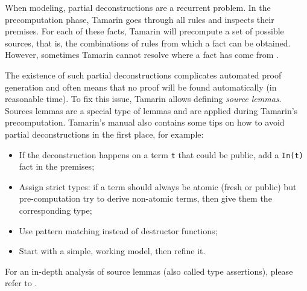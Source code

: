 When modeling, partial deconstructions are a recurrent problem. In the precomputation phase, Tamarin goes through all rules and inspects their premises. For each of these facts, Tamarin will precompute a set of possible sources, that is, the combinations of rules from which a fact can be obtained. However, sometimes Tamarin cannot resolve where a fact has come from \cite{TamarinProverManual}.

The existence of such partial deconstructions complicates automated proof generation and often means that no proof will be found automatically (in reasonable time). To fix this issue, Tamarin allows defining \textit{source lemmas}. Sources lemmas are a special type of lemmas and are applied during Tamarin's precomputation. Tamarin's manual also contains some tips on how to avoid partial deconstructions in the first place, for example:

\begin{itemize}
  \item If the deconstruction happens on a term \lstinline{t} that could be public, add a \lstinline{In(t)} fact in the premises;
  \item Assign strict types: if a term should always be atomic (fresh or public) but pre-computation try to derive non-atomic terms, then give them the corresponding type;
  \item Use pattern matching instead of destructor functions;
  \item Start with a simple, working model, then refine it.
\end{itemize}

For an in-depth analysis of source lemmas (also called type assertions), please refer to \cite{Meier2013AdvancingAS}.
